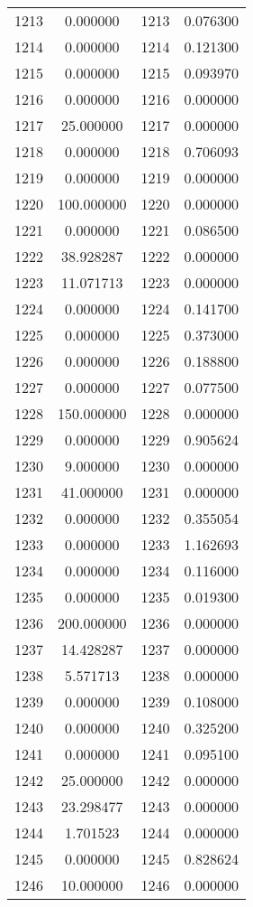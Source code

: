 \documentclass[12pt]{article}
\begin{document}
\begin{longtable}{@{}cccc@{}}
1213 & 0.000000 & 1213 & 0.076300 \\
1214 & 0.000000 & 1214 & 0.121300 \\
1215 & 0.000000 & 1215 & 0.093970 \\
1216 & 0.000000 & 1216 & 0.000000 \\
1217 & 25.000000 & 1217 & 0.000000 \\
1218 & 0.000000 & 1218 & 0.706093 \\
1219 & 0.000000 & 1219 & 0.000000 \\
1220 & 100.000000 & 1220 & 0.000000 \\
1221 & 0.000000 & 1221 & 0.086500 \\
1222 & 38.928287 & 1222 & 0.000000 \\
1223 & 11.071713 & 1223 & 0.000000 \\
1224 & 0.000000 & 1224 & 0.141700 \\
1225 & 0.000000 & 1225 & 0.373000 \\
1226 & 0.000000 & 1226 & 0.188800 \\
1227 & 0.000000 & 1227 & 0.077500 \\
1228 & 150.000000 & 1228 & 0.000000 \\
1229 & 0.000000 & 1229 & 0.905624 \\
1230 & 9.000000 & 1230 & 0.000000 \\
1231 & 41.000000 & 1231 & 0.000000 \\
1232 & 0.000000 & 1232 & 0.355054 \\
1233 & 0.000000 & 1233 & 1.162693 \\
1234 & 0.000000 & 1234 & 0.116000 \\
1235 & 0.000000 & 1235 & 0.019300 \\
1236 & 200.000000 & 1236 & 0.000000 \\
1237 & 14.428287 & 1237 & 0.000000 \\
1238 & 5.571713 & 1238 & 0.000000 \\
1239 & 0.000000 & 1239 & 0.108000 \\
1240 & 0.000000 & 1240 & 0.325200 \\
1241 & 0.000000 & 1241 & 0.095100 \\
1242 & 25.000000 & 1242 & 0.000000 \\
1243 & 23.298477 & 1243 & 0.000000 \\
1244 & 1.701523 & 1244 & 0.000000 \\
1245 & 0.000000 & 1245 & 0.828624 \\
1246 & 10.000000 & 1246 & 0.000000 \\

\end{longtable}
\end{document}
